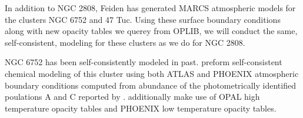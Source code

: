 In addition to NGC 2808, Feiden has generated MARCS atmospheric models for the
clusters NGC 6752 and 47 Tuc. Using these surface boundary conditions along
with new opacity tables we querey from OPLIB, we will conduct the same,
self-consistent, modeling for these clusters as we do for NGC 2808.

NGC 6752 has been self-consistently modeled in past. \citet{Dotter2015} preform
self-consistent chemical modeling of this cluster using both ATLAS and PHOENIX
atmospheric boundary conditions computed from abundance of the photometrically
identified poulations A and C reported by \citet{Milone2013}.
\citeauthor{Dotter2015} additionally make use of OPAL high temperature opacity
tables and PHOENIX low temperature opacity tables.
